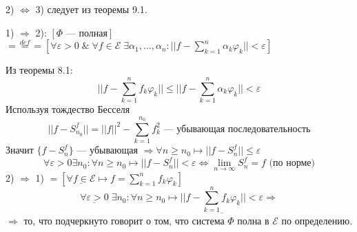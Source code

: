 \begin{greyProof}
	2) $ \Leftrightarrow $ 3) следует из теоремы 9.1.
	
	1) $ \Rightarrow $ 2): $\left[  \Phi \text{ --- полная} \right]$ $ \overset{def}{=\!\!=\!\!=} \left[ \forall \varepsilon >0 \;\&\; \forall f \in \mathcal{E}\; \exists \alpha_1,\ldots, \alpha_n: ||f-\sum_{k=1}^n \alpha_k \varphi_k || < \varepsilon \right] $
	
	Из теоремы 8.1:
	\[
		||f - \sum_{k=1}^n f_k\varphi_k || \leqslant ||f - \sum_{k=1}^n \alpha_k \varphi_k|| <\varepsilon
	\]
	Используя тождество Бесселя
	\[
		||f - S_{n_0}^f|| = ||f||^2 - \sum_{k=1}^{n_0}f_k^2\text{ --- убывающая последовательность}
	\]
	Значит $ \{ f - S_n^f \}  $ --- убывающая $ \Rightarrow \forall n \geqslant  n_0 \mapsto ||f - S_n^f || \leqslant \varepsilon$ 
	\[
		\forall \varepsilon > 0 \exists n_0: \forall n \geqslant n_0 \mapsto ||f - S_n^f || < \varepsilon
	 \Leftrightarrow \lim\limits_{n \rightarrow \infty} S_n^f = f  \text{ (по норме)}
	\]
	2) $ \Rightarrow  $ 1)  $ = \left[ \underline{\forall f \in \mathcal{E}} \mapsto f = \sum_{k=1}^n f_k \varphi_k \right] $
	\[
		\underline{\forall \varepsilon > 0} \; \exists n_0: \forall n \geqslant n_0 \mapsto \underline{||f - \sum_{k=1}^n f_k \varphi_k || < \varepsilon} \Rightarrow
	\]
	$ \Rightarrow $ то, что подчеркнуто говорит о том, что система $ \Phi $ полна в $ \mathcal{E} $ по определению.
\end{greyProof}	
